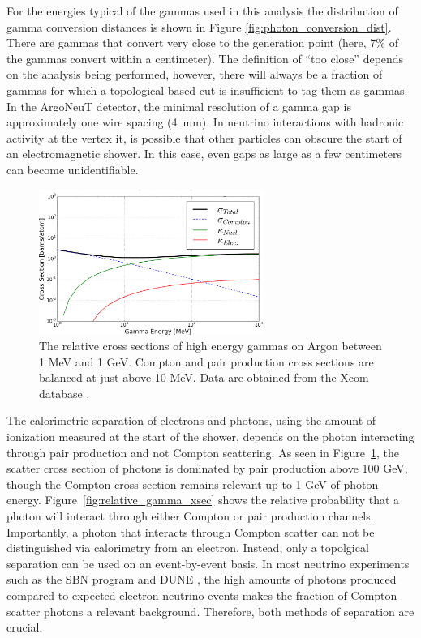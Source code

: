For the energies typical of the gammas used in this analysis the distribution of gamma conversion distances is shown in Figure \ref{fig:photon_conversion_dist}.  There are gammas that convert very close to the generation point (here, 7\% of the gammas convert within a centimeter).  The definition of ``too close'' depends on the analysis being performed, however, there will always be a fraction of gammas for which a topological based cut is insufficient to tag them as gammas.  In the ArgoNeuT detector, the minimal resolution of a gamma gap is approximately one wire spacing (4~mm). In neutrino interactions with hadronic activity at the vertex it, is possible that other particles can obscure the start of an electromagnetic shower.  In this case, even gaps as large as a few centimeters can become unidentifiable.

\begin{figure}[ht!]
  \centering
  \includegraphics[width=0.65\textwidth]{emshower_figures/photonCrossSection_trimmed.png}
  \caption[Photon Cross Section on Argon]{\label{fig:gamma_xsec} The relative cross sections of high energy gammas on Argon between 1 MeV and 1 GeV. Compton and pair production cross sections are balanced at just above 10 MeV.  Data are obtained from the Xcom database \cite{Xcom}.}
\end{figure}

The calorimetric separation of electrons and photons, using the amount of ionization measured at the start of the shower, depends on the photon interacting through pair production and not Compton scattering.  As seen in Figure~\ref{fig:gamma_xsec}, the scatter cross section of photons is dominated by pair production above 100 GeV, though the Compton cross section remains relevant up to 1 GeV of photon energy.  Figure~\ref{fig:relative_gamma_xsec} shows the relative probability that a photon will interact through either Compton or pair production channels.  Importantly, a photon that interacts through Compton scatter can not be distinguished via calorimetry from an electron.  Instead, only a topolgical separation can be used on an event-by-event basis.  In most neutrino experiments such as the SBN program \cite{Antonello:2015lea} and DUNE \cite{DUNE}, the high amounts of photons produced compared to expected electron neutrino events makes the fraction of Compton scatter photons a relevant background.  Therefore, both methods of separation are crucial.

